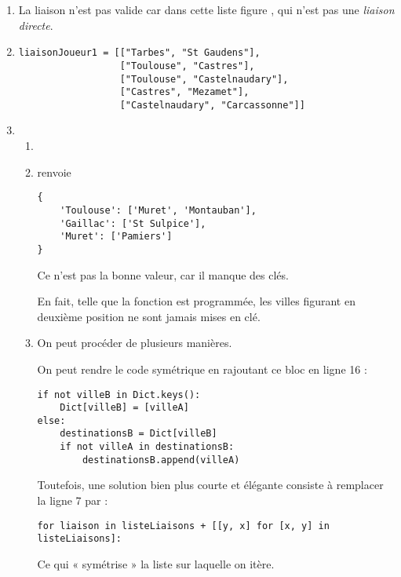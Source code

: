 \documentclass[a4paper,12pt,french]{article}
\begin{document}
\begin{enumerate}[\bfseries 1.]
\item 	La liaison n'est pas valide car dans cette liste figure , qui n'est pas une \textit{liaison directe}.
\item 	\begin{verbatim}
liaisonJoueur1 = [["Tarbes", "St Gaudens"],
                  ["Toulouse", "Castres"],
                  ["Toulouse", "Castelnaudary"],
                  ["Castres", "Mezamet"],
                  ["Castelnaudary", "Carcassonne"]] 
\end{verbatim}
\item \begin{enumerate}[\bfseries a.]
\item 	{} 
\item 	 {} renvoie
\begin{verbatim}
{
    'Toulouse': ['Muret', 'Montauban'],
    'Gaillac': ['St Sulpice'],
    'Muret': ['Pamiers']
}
\end{verbatim}
Ce n'est pas la bonne valeur, car il manque des clés.

En fait, telle que la fonction est programmée, les villes figurant en deuxième position ne sont jamais mises en clé.
\item On peut procéder de plusieurs manières.

On peut rendre le code symétrique en rajoutant ce bloc en ligne 16 :

\begin{verbatim}
if not villeB in Dict.keys():
    Dict[villeB] = [villeA]
else:
    destinationsB = Dict[villeB]
    if not villeA in destinationsB:
        destinationsB.append(villeA)
\end{verbatim}

Toutefois, une solution bien plus courte et élégante consiste à remplacer la ligne 7 par :

\begin{verbatim}
for liaison in listeLiaisons + [[y, x] for [x, y] in listeLiaisons]:
\end{verbatim}
Ce qui « symétrise » la liste sur laquelle on itère.
\end{enumerate}
\end{enumerate}

\exo{}
\end{document}
